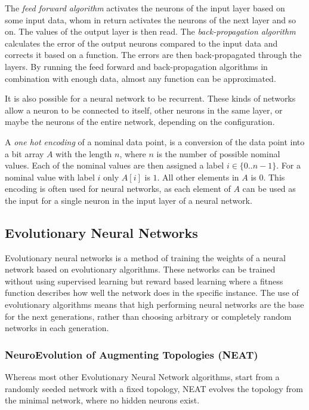 \newpar The \textit{feed forward algorithm} activates the neurons of the input layer based on some input data, whom in return activates the neurons of the next layer and so on. The values of the output layer is then read. The \textit{back-propagation algorithm} calculates the error of the output neurons compared to the input data and corrects it based on a function. The errors are then back-propagated through the layers. By running the feed forward and back-propagation algorithms in combination with enough data, almost any function can be approximated.

\newpar It is also possible for a neural network to be recurrent. These kinds of networks allow a neuron to be connected to itself, other neurons in the same layer, or maybe the neurons of the entire network, depending on the configuration.

\newpar A \textit{one hot encoding} of a nominal data point, is a conversion of the data point into a bit array $A$ with the length $n$, where $n$ is the number of possible nominal values. Each of the nominal values are then assigned a label $i \in \{0 .. n-1\}$. For a nominal value with label $i$ only $ A[i] $ is $1$. All other elements in $A$ is $0$. This encoding is often used for neural networks, as each element of $A$ can be used as the input for a single neuron in the input layer of a neural network.

\subsection{Evolutionary Neural Networks}
Evolutionary neural networks is a method of training the weights of a neural network based on evolutionary algorithms. These networks can be trained without using supervised learning but reward based learning where a fitness function describes how well the network does in the specific instance. The use of evolutionary algorithms means that high performing neural networks are the base for the next generations, rather than choosing arbitrary or completely random networks in each generation.

\subsubsection{NeuroEvolution of Augmenting Topologies (NEAT)}
Whereas most other Evolutionary Neural Network algorithms, start from a randomly seeded network with a fixed topology, NEAT evolves the topology from the minimal network, where no hidden neurons exist.

